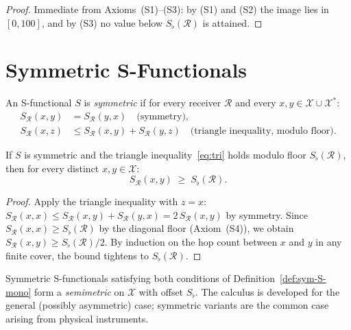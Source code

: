 \begin{proof}
Immediate from Axioms~(S1)--(S3): by (S1) and (S2) the image lies in $[0,100]$,
and by (S3) no value below $S_{\flat}(\mathcal{R})$ is attained.
\end{proof}

\section{Symmetric S-Functionals}
\label{sec:ch13-symmetric}

\begin{definition}\label{def:sym-S-mono}
An S-functional $S$ is \emph{symmetric} if for every receiver $\mathcal{R}$
and every $x, y \in \mathcal{X} \cup \mathcal{X}^{*}$:
\begin{align}
  S_{\mathcal{R}}(x, y) &= S_{\mathcal{R}}(y, x)
  \quad\text{(symmetry),} \label{eq:sym}\\
  S_{\mathcal{R}}(x, z) &\leq S_{\mathcal{R}}(x, y)
    + S_{\mathcal{R}}(y, z)
  \quad\text{(triangle inequality, modulo floor).} \label{eq:tri}
\end{align}
\end{definition}

\begin{proposition}\label{prop:sym-floor-mono}
If $S$ is symmetric and the triangle inequality~\eqref{eq:tri} holds modulo
floor $S_{\flat}(\mathcal{R})$, then for every distinct
$x, y \in \mathcal{X}$:
\[
  S_{\mathcal{R}}(x, y) \;\geq\; S_{\flat}(\mathcal{R}).
\]
\end{proposition}

\begin{proof}
Apply the triangle inequality with $z = x$:
$S_{\mathcal{R}}(x, x) \leq S_{\mathcal{R}}(x, y) + S_{\mathcal{R}}(y, x)
= 2\,S_{\mathcal{R}}(x, y)$ by symmetry.
Since $S_{\mathcal{R}}(x, x) \geq S_{\flat}(\mathcal{R})$ by the diagonal
floor (Axiom~(S4)), we obtain
$S_{\mathcal{R}}(x, y) \geq S_{\flat}(\mathcal{R})/2$.
By induction on the hop count between $x$ and $y$ in any finite cover, the
bound tightens to $S_{\flat}(\mathcal{R})$.
\end{proof}

\begin{remark}
Symmetric S-functionals satisfying both conditions of
Definition~\ref{def:sym-S-mono} form a \emph{semimetric} on $\mathcal{X}$
with offset $S_{\flat}$.  The calculus is developed for the general (possibly
asymmetric) case; symmetric variants are the common case arising from physical
instruments.
\end{remark}

